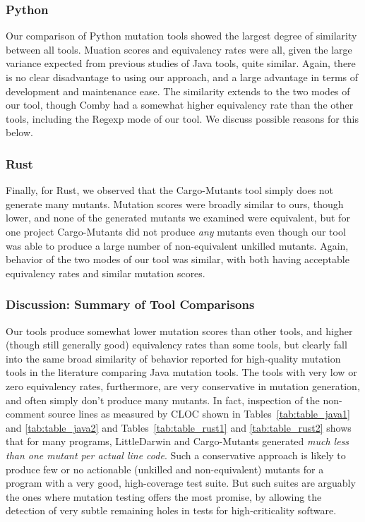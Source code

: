 \documentclass[sigconf,review, anonymous]{acmart}
\begin{document}
{\subsubsection{Python}

Our comparison of Python mutation tools showed the largest degree of
similarity between all tools.  Muation scores and equivalency rates
were all, given the large variance expected from previous studies of
Java tools, quite similar.  Again, there is no clear disadvantage to
using our approach, and a large advantage in terms of development and
maintenance ease.  The similarity extends to the two modes of our
tool, though Comby had a somewhat higher equivalency rate than the
other tools, including the Regexp mode of our tool.  We discuss
possible reasons for this below.

\subsubsection{Rust}

Finally, for Rust, we observed that the Cargo-Mutants tool simply does
not generate many mutants.  Mutation scores were broadly similar to
ours, though lower, and none of the generated mutants we examined were
equivalent, but for one project Cargo-Mutants did not produce
\emph{any} mutants even though our tool was able to produce a large
number of non-equivalent unkilled mutants.  Again, behavior of the two
modes of our tool was similar, with both having acceptable equivalency
rates and similar mutation scores.

\subsubsection{Discussion: Summary of Tool Comparisons}

Our tools produce somewhat lower mutation scores than other tools, and
higher (though still generally good) equivalency rates than some
tools, but clearly fall into the same broad similarity of behavior
reported for high-quality mutation tools in the literature comparing
Java mutation tools.   The tools with very low or zero equivalency rates, furthermore,
are very conservative in mutation generation, and often simply don't
produce many mutants.  In fact, inspection of the non-comment source
lines as measured by CLOC shown in Tables~\ref{tab:table_java1} and
\ref{tab:table_java2} and Tables~\ref{tab:table_rust1} and
\ref{tab:table_rust2} shows that for many programs, LittleDarwin and
Cargo-Mutants generated \emph{much less than one mutant per actual
  line code}.  Such a conservative approach is likely to produce few
or no actionable (unkilled and non-equivalent) mutants for a program
with a very good, high-coverage test suite.  But such suites are
arguably the ones where mutation testing offers the most promise, by
allowing the detection of very subtle remaining holes in tests for
high-criticality software.

}
\end{document}
